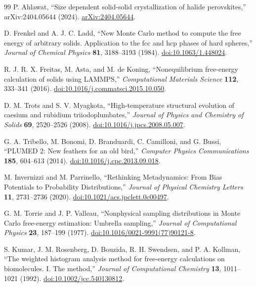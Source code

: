 \documentclass[aps,prx,preprint,notitlepage,superscriptaddress,nofootinbib,floatfix]{revtex4-2}
\newif\ifshowrevisions
\newcommand{\draftseven}[1]{%
  \ifshowrevisions\textcolor{draftsevencolor}{#1}\else#1\fi}
\newcommand{\drafttwentyfive}[1]{%
  \ifshowrevisions\textcolor{drafttwentyfivecolor}{#1}\else#1\fi}
\begin{document}
\begin{thebibliography}{99}
P. Ahlawat,
``Size dependent solid-solid crystallization of halide perovskites,''
arXiv:2404.05644 (2024).
\href{https://arxiv.org/abs/2404.05644}{arXiv:2404.05644}.

\drafttwentyfive{D. Frenkel and A. J. C. Ladd,
``New Monte Carlo method to compute the free energy of arbitrary solids.
Application to the fcc and hcp phases of hard spheres,''
\emph{Journal of Chemical Physics} \textbf{81}, 3188--3193 (1984).
\href{https://doi.org/10.1063/1.448024}{doi:10.1063/1.448024}.}

\drafttwentyfive{R. J. R. X. Freitas, M. Asta, and M. de Koning,
``Nonequilibrium free-energy calculation of solids using LAMMPS,''
\emph{Computational Materials Science} \textbf{112}, 333--341 (2016).
\href{https://doi.org/10.1016/j.commatsci.2015.10.050}{doi:10.1016/j.commatsci.2015.10.050}.}

\drafttwentyfive{D. M. Trots and S. V. Myagkota,
``High-temperature structural evolution of caesium and rubidium
triiodoplumbates,'' \emph{Journal of Physics and Chemistry of Solids}
\textbf{69}, 2520--2526 (2008).
\href{https://doi.org/10.1016/j.jpcs.2008.05.007}{doi:10.1016/j.jpcs.2008.05.007}.}

G. A. Tribello, M. Bonomi, D. Branduardi, C. Camilloni, and G. Bussi,
``PLUMED 2: New feathers for an old bird,''
\emph{Computer Physics Communications} \textbf{185}, 604--613 (2014).
\href{https://doi.org/10.1016/j.cpc.2013.09.018}{doi:10.1016/j.cpc.2013.09.018}.

M. Invernizzi and M. Parrinello,
``Rethinking Metadynamics: From Bias Potentials to Probability Distributions,''
\emph{Journal of Physical Chemistry Letters} \textbf{11}, 2731--2736 (2020).
\href{https://doi.org/10.1021/acs.jpclett.0c00497}{doi:10.1021/acs.jpclett.0c00497}.

\draftseven{G. M. Torrie and J. P. Valleau,
``Nonphysical sampling distributions in Monte Carlo free-energy estimation:
Umbrella sampling,'' \emph{Journal of Computational Physics} \textbf{23},
187--199 (1977).
\href{https://doi.org/10.1016/0021-9991(77)90121-8}{doi:10.1016/0021-9991(77)90121-8}.}

\draftseven{S. Kumar, J. M. Rosenberg, D. Bouzida, R. H. Swendsen, and
P. A. Kollman,
``The weighted histogram analysis method for free-energy calculations on
biomolecules. I. The method,'' \emph{Journal of Computational Chemistry}
\textbf{13}, 1011--1021 (1992).
\href{https://doi.org/10.1002/jcc.540130812}{doi:10.1002/jcc.540130812}.}


\end{thebibliography}
\end{document}
